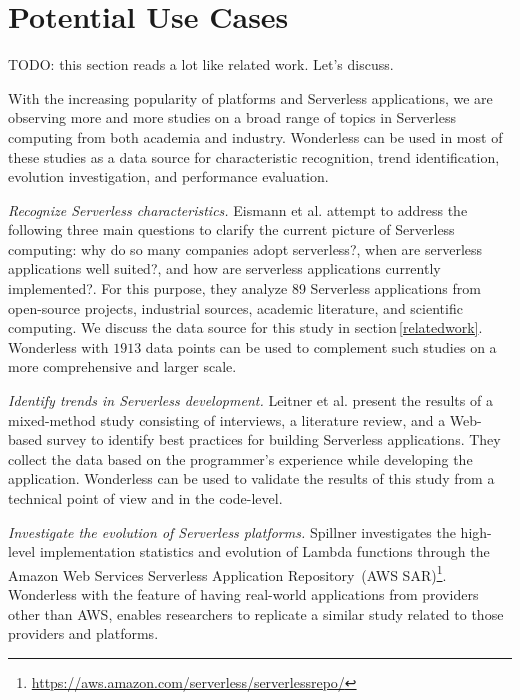 \section{Potential Use Cases}
\label{usecase}

TODO: this section reads a lot like related work. Let's discuss.

With the increasing popularity of \faas platforms and Serverless applications, 
we are observing more and more studies on a broad range of topics in 
Serverless computing from both academia and industry. Wonderless can 
be used in most of these studies as a data source for characteristic recognition, 
trend identification, evolution investigation, and performance evaluation.

\vspace{2mm}
\emph{Recognize Serverless characteristics.}
Eismann et al.\cite{eismann2020serverless} attempt to address the following 
three main questions to clarify the current picture of Serverless computing: 
why do so many companies adopt serverless?, when are serverless applications 
well suited?, and how are serverless applications currently implemented?. For this 
purpose, they analyze 89 Serverless applications from open-source projects, 
industrial sources, academic literature, and scientific computing. We discuss 
the data source for this study in section\,\ref{relatedwork}. Wonderless with 
$1913$ data points can be used to complement such studies on a more 
comprehensive and larger scale.

\vspace{2mm}
\emph{Identify trends in Serverless development.}
Leitner et al.\cite{leitner2019mixed} present the results of a mixed-method 
study consisting of interviews, a literature review, and a Web-based survey 
to identify best practices for building Serverless applications. 
They collect the data based on the programmer's experience while 
developing the application. Wonderless can be used to validate the 
results of this study from a technical point of view and in the code-level.

\vspace{2mm}
\emph{Investigate the evolution of Serverless platforms.}
Spillner\cite{spillner2019quantitative} investigates the high-level 
implementation statistics and evolution of Lambda functions through the 
Amazon Web Services Serverless Application Repository\,
(AWS SAR)\footnote{\url{https://aws.amazon.com/serverless/serverlessrepo/}}. 
Wonderless with the feature of having real-world applications from
providers other than AWS, enables researchers to replicate a similar 
study related to those providers and platforms.

